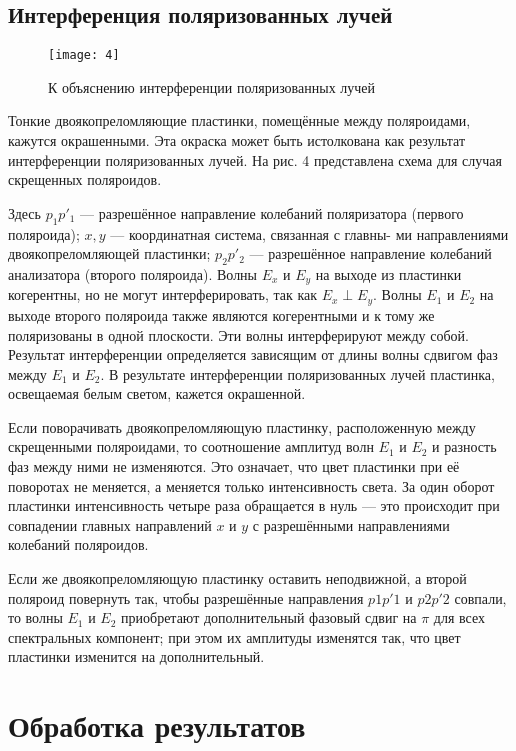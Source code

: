 \subsection{Интерференция поляризованных лучей}

\begin{wrapfigure}{r}{0.35\linewidth}
	\texttt{[image: 4]}
	\caption{К объяснению интерференции
		поляризованных лучей}
	\label{ris 4}
\end{wrapfigure}


Тонкие двоякопреломляющие пластинки, помещённые между поляроидами, кажутся окрашенными. Эта окраска может быть истолкована как результат интерференции поляризованных лучей. На рис. 4 представлена схема для
случая скрещенных поляроидов.

Здесь $ p_1p'_1 $ --- разрешённое направление колебаний поляризатора
(первого поляроида); $ x, y $ --- координатная система, связанная с главны-
ми направлениями двоякопреломляющей пластинки; $ p_2p'_2 $ --- разрешённое направление колебаний анализатора (второго поляроида). Волны
$ E_x  $ и $ E_y $ на выходе из пластинки когерентны, но не могут интерферировать, так как $ E_x \perp  E_y $. Волны $ E_1 $ и $ E_2 $ на выходе второго поляроида
также являются когерентными и к тому же поляризованы в одной плоскости. Эти волны интерферируют между собой. Результат интерференции определяется зависящим от длины волны сдвигом фаз между $ E_1 $
и $ E_2 $. В результате интерференции поляризованных лучей пластинка, освещаемая белым светом, кажется окрашенной.

Если поворачивать двоякопреломляющую пластинку, расположенную между
скрещенными поляроидами, то соотношение амплитуд волн $ E_1 $ и $ E_2 $ и разность фаз между ними не изменяются. Это означает, что цвет пластинки при её поворотах не меняется, а меняется только интенсивность света. За один оборот пластинки интенсивность четыре раза обращается в нуль --- это происходит при совпадении главных направлений
$ x $ и $ y $ с разрешёнными направлениями колебаний поляроидов.

Если же двоякопреломляющую пластинку оставить неподвижной, а
второй поляроид повернуть так, чтобы разрешённые направления $ p1p'1 $
и $ p2p'2 $ совпали, то волны $ E_1 $ и $ E_2 $ приобретают дополнительный фазовый сдвиг на $ \pi $ для всех спектральных компонент; при этом их амплитуды изменятся так, что цвет пластинки изменится на дополнительный. 

	
\section{Обработка результатов}


